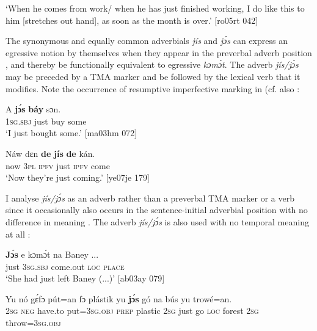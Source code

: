 \glt ‘When he comes from work/ when he has just finished working, I do like 
this to him [stretches out hand], as soon as the month is over.’ [ro05rt 042]
\z

The synonymous and equally common adverbials \textit{jís} and \textit{jɔ́s} can express an egressive notion by themselves when they appear in the preverbal adverb position , and thereby be functionally equivalent to egressive \textit{kɔmɔ́t}. The adverb \textit{jís/jɔ́s} may be preceded by a TMA marker and be followed by the lexical verb that it modifies. Note the occurrence of resumptive imperfective marking in  (cf. also :


\ea%
    \label{ex:key:358}
    \gll A    \textbf{jɔ́s} \textbf{báy} sɔn.\\
\textsc{1sg.sbj}  just  buy  some\\

\glt ‘I just bought some.’ [ma03hm 072]
\z


\ea%
    \label{ex:key:359}
    \gll Náw    dɛn  \textbf{de}  \textbf{jís}  \textbf{de}  kán.\\
now    \textsc{3pl}  \textsc{ipfv}  just  \textsc{ipfv}  come\\

\glt ‘Now they’re just coming.’ [ye07je 179]
\z

I analyse \textit{jís/jɔ́s} as an adverb rather than a preverbal TMA marker or a verb since it occasionally also occurs in the sentence-initial adverbial position with no difference in meaning . The adverb \textit{jís/jɔ́s} is also used with no temporal meaning at all : 


\ea%
    \label{ex:key:360}
    \gll \textbf{Jɔ́s}  e    kɔmɔ́t    na  Baney  \op...\cp{}\\
just  \textsc{3sg.sbj}  come.out  \textsc{loc}  \textsc{place}\\

\glt ‘She had just left Baney (...)’ [ab03ay 079]
\z


\ea%
    \label{ex:key:361}
    \gll Yu  nó  gɛ́fɔ    pút=an    fɔ  plástik  yu  \textbf{jɔ́s}  gó
na  bús    yu  trowé=an.\\
\textsc{2sg}  \textsc{neg}  have.to  put=\textsc{3sg.obj}  \textsc{prep}  plastic  \textsc{2sg}  just  go
\textsc{loc}  forest  \textsc{2sg}  throw=\textsc{3sg.obj}\\

